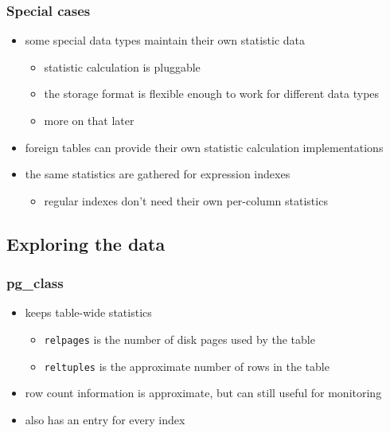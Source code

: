 \documentclass{beamer}
\begin{document}
\begin{frame}
  \frametitle{Special cases}

  \begin{itemize}
  \item some \alert{special data types} maintain their own statistic data
    \begin{itemize}
    \item statistic calculation is \alert{pluggable}
    \item the storage format is \alert{flexible} enough to work for different data types
    \item more on that later
    \end{itemize}
  \item \alert{foreign tables} can provide their own statistic calculation implementations
  \item the same statistics are gathered for \alert{expression indexes}
    \begin{itemize}
    \item regular indexes don't need their own per-column statistics
    \end{itemize}
  \end{itemize}
\end{frame}

\subsection{Exploring the data}

\begin{frame}
  \frametitle{pg\_class}

  \begin{itemize}
  \item keeps \alert{table-wide} statistics
    \begin{itemize}
    \item \texttt{relpages} is the number of \alert{disk pages} used by the table
    \item \texttt{reltuples} is the approximate number of \alert{rows} in the table
    \end{itemize}
  \item row count information is \alert{approximate}, but can still useful for monitoring
  \item also has an entry for \alert{every index}
  \end{itemize}
\end{frame}
\end{document}
